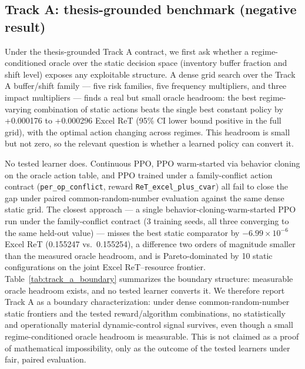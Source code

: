 \hypertarget{42-track-a}{%
\subsection{Track A: thesis-grounded benchmark (negative
result)}\label{42-track-a}}

Under the thesis-grounded Track A contract, we first ask whether a
regime-conditioned oracle over the static decision space (inventory
buffer fraction and shift level) exposes any exploitable structure. A
dense grid search over the Track A buffer/shift family --- five risk
families, five frequency multipliers,
and three impact multipliers --- finds a real but small oracle headroom: the
best regime-varying combination of static actions beats the single best
constant policy by +0.000176 to +0.000296 Excel ReT (95\% CI lower bound
positive in the full grid), with the optimal action changing across
regimes. This headroom is small but not zero, so the relevant question is
whether a learned policy can convert it.

No tested learner does. Continuous PPO, PPO warm-started via behavior
cloning on the oracle action table, and PPO trained under a family-conflict
action contract (\texttt{per\_op\_conflict}, reward
\texttt{ReT\_excel\_plus\_cvar}) all fail to close the gap under
paired common-random-number evaluation against the same dense static
grid. The closest approach --- a single behavior-cloning-warm-started PPO
run under the family-conflict contract (3 training seeds, all three
converging to the same held-out value) --- misses the best static
comparator by
$-6.99\times10^{-6}$ Excel ReT (0.155247 vs.\ 0.155254), a difference two
orders of magnitude smaller than the measured oracle headroom, and is
Pareto-dominated by 10 static configurations on the joint Excel
ReT--resource frontier. Table~\ref{tab:track_a_boundary} summarizes the
boundary structure: measurable oracle headroom exists, and no tested
learner converts it. We therefore report Track A as a boundary
characterization: under dense common-random-number static frontiers and
the tested reward/algorithm combinations, no statistically and
operationally material dynamic-control
signal survives, even though a small regime-conditioned oracle headroom
is measurable. This is not claimed as a proof of mathematical
impossibility, only as the outcome of the tested learners under fair,
paired evaluation.

